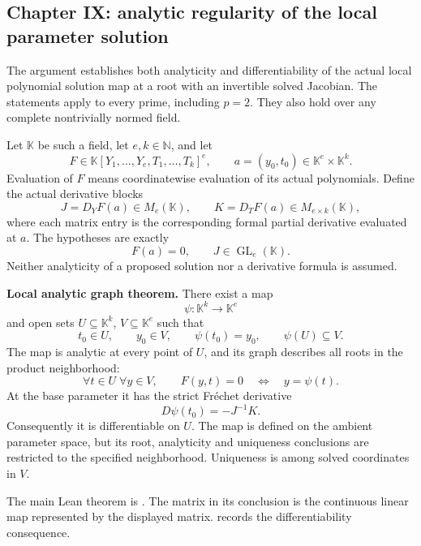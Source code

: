 \hypertarget{cont11:paper-ix-analytic-regularity-of-the-local-parameter-solution}{%
\subsection{Chapter IX: analytic regularity of the local parameter
solution}\label{cont11:paper-ix-analytic-regularity-of-the-local-parameter-solution}}

The argument establishes both analyticity and differentiability of the
actual local polynomial solution map at a root with an invertible solved
Jacobian. The statements apply to every prime, including \(p=2\). They
also hold over any complete nontrivially normed field.

Let \(\mathbb K\) be such a field, let \(e,k\in\mathbb N\), and let \[
F\in\mathbb K[Y_1,\ldots,Y_e,T_1,\ldots,T_k]^e,
\qquad a=(y_0,t_0)\in\mathbb K^e\times\mathbb K^k.
\] Evaluation of \(F\) means coordinatewise evaluation of its actual
polynomials. Define the actual derivative blocks \[
J=D_YF(a)\in M_e(\mathbb K),
\qquad K=D_TF(a)\in M_{e\times k}(\mathbb K),
\] where each matrix entry is the corresponding formal partial
derivative evaluated at \(a\). The hypotheses are exactly \[
F(a)=0,
\qquad J\in\operatorname{GL}_e(\mathbb K).
\] Neither analyticity of a proposed solution nor a derivative formula
is assumed.

\textbf{Local analytic graph theorem.} There exist a map \[
\psi:\mathbb K^k\longrightarrow\mathbb K^e
\] and open sets \(U\subseteq\mathbb K^k\), \(V\subseteq\mathbb K^e\)
such that \[
t_0\in U,\qquad y_0\in V,\qquad \psi(t_0)=y_0,
\qquad \psi(U)\subseteq V.
\] The map is analytic at every point of \(U\), and its graph describes
all roots in the product neighborhood: \[
\forall t\in U\;\forall y\in V,
\qquad F(y,t)=0\quad\Longleftrightarrow\quad y=\psi(t).
\] At the base parameter it has the strict Fréchet derivative \[
\boxed{D\psi(t_0)=-J^{-1}K.}
\] Consequently it is differentiable on \(U\). The map is defined on the
ambient parameter space, but its root, analyticity and uniqueness
conclusions are restricted to the specified neighborhood. Uniqueness is
among solved coordinates in \(V\).

The main Lean theorem is
.
The matrix in its  conclusion is the
continuous linear map represented by the displayed matrix.
 records the
differentiability consequence.

